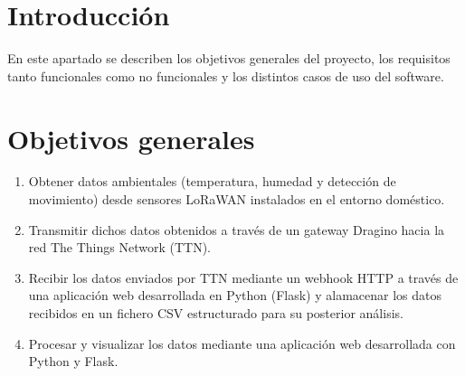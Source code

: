 
\section{Introducción}

En este apartado se describen los objetivos generales del proyecto, los requisitos tanto funcionales como no funcionales y los distintos casos de uso del software.

%
\section{Objetivos generales}
\begin{enumerate}

    \item Obtener datos ambientales (temperatura, humedad y detección de movimiento) desde sensores LoRaWAN instalados en el entorno doméstico.
    \item Transmitir dichos datos obtenidos a través de un gateway Dragino hacia la red The Things Network (TTN).
     \item Recibir los datos enviados por TTN mediante un webhook HTTP a través de una aplicación web desarrollada en Python (Flask) y alamacenar los datos recibidos en un fichero CSV estructurado para su posterior análisis.
    \item Procesar y visualizar los datos mediante una aplicación web desarrollada con Python y Flask.
    

\end{enumerate}
